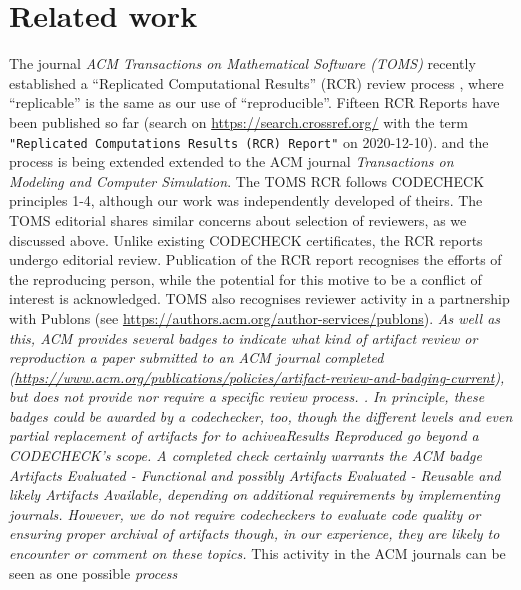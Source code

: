 \documentclass[12pt]{article}
\newcommand{\rev}[1]{\textit{#1}}
\begin{document}
\section*{Related work}\label{related-work}

The journal \emph{ACM Transactions on Mathematical Software (TOMS)}
recently established a ``Replicated Computational Results'' (RCR)
review process \cite{heroux_editorial_2015}, where ``replicable'' is
the same as our use of ``reproducible''.  Fifteen RCR Reports have
been published so far (search on \url{https://search.crossref.org/}
with the term \texttt{"Replicated Computations Results (RCR) Report"}
on 2020-12-10).
and the process is being extended extended to the ACM journal
\emph{Transactions on Modeling and Computer Simulation}.
The TOMS RCR follows CODECHECK principles 1-4, although our work was
independently developed of theirs.  The TOMS editorial
\cite{heroux_editorial_2015} shares similar concerns about selection
of reviewers, as we discussed above. Unlike existing CODECHECK
certificates, the RCR reports undergo editorial review.  Publication
of the RCR report recognises the efforts of the reproducing person,
while the potential for this motive to be a conflict of interest is
acknowledged.  TOMS also recognises reviewer activity in a partnership
with Publons (see
\url{https://authors.acm.org/author-services/publons}).  \rev{As well
  as this, ACM provides several badges to indicate what kind of artifact review or reproduction a paper submitted to an ACM journal completed (\url{https://www.acm.org/publications/policies/artifact-review-and-badging-current}), but does not provide nor require a specific review process. . In principle, these badges could be awarded by a codechecker, too, though the different levels and even partial replacement of artifacts for to achivea\emph{Results Reproduced} go beyond a CODECHECK's scope. A completed check certainly warrants the ACM badge \emph{Artifacts Evaluated - Functional} and possibly \emph{Artifacts Evaluated - Reusable} and likely \emph{Artifacts Available}, depending on additional requirements by implementing journals. However, we do not require codecheckers to evaluate code quality or ensuring proper archival of artifacts though, in our experience, they are likely to encounter or comment on these topics.}
This activity in the ACM journals can be seen as one possible \rev{process}
\end{document}
